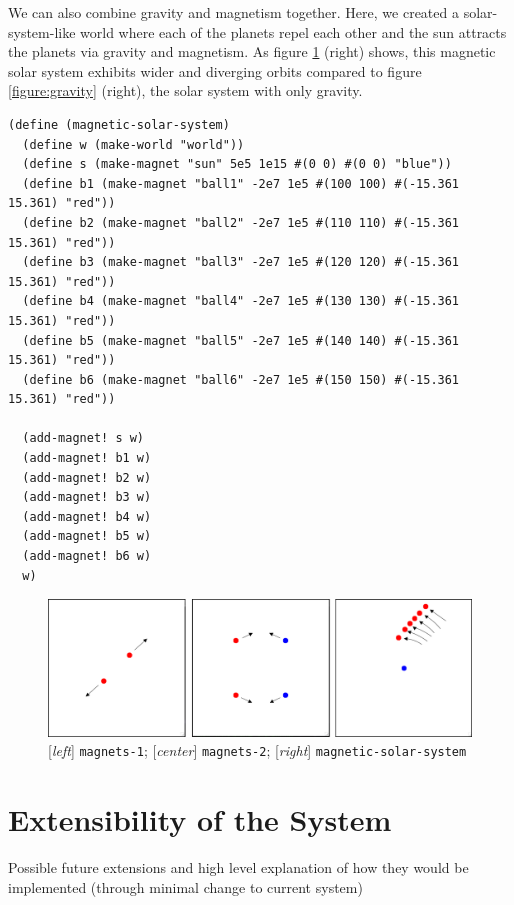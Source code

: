 \documentclass{article}
\begin{document}
We can also combine gravity and magnetism together. Here, we created a solar-system-like world where each of the planets repel each other and the sun attracts the planets via gravity and magnetism. As figure \ref{figure:magnetism} (right) shows, this magnetic solar system exhibits wider and diverging orbits compared to figure \ref{figure:gravity} (right), the solar system with only gravity. 
{\small\begin{verbatim}
(define (magnetic-solar-system)
  (define w (make-world "world"))
  (define s (make-magnet "sun" 5e5 1e15 #(0 0) #(0 0) "blue"))
  (define b1 (make-magnet "ball1" -2e7 1e5 #(100 100) #(-15.361 15.361) "red"))
  (define b2 (make-magnet "ball2" -2e7 1e5 #(110 110) #(-15.361 15.361) "red"))
  (define b3 (make-magnet "ball3" -2e7 1e5 #(120 120) #(-15.361 15.361) "red"))
  (define b4 (make-magnet "ball4" -2e7 1e5 #(130 130) #(-15.361 15.361) "red"))
  (define b5 (make-magnet "ball5" -2e7 1e5 #(140 140) #(-15.361 15.361) "red"))
  (define b6 (make-magnet "ball6" -2e7 1e5 #(150 150) #(-15.361 15.361) "red"))

  (add-magnet! s w)
  (add-magnet! b1 w)
  (add-magnet! b2 w)
  (add-magnet! b3 w)
  (add-magnet! b4 w)
  (add-magnet! b5 w)
  (add-magnet! b6 w)
  w)
\end{verbatim}}

\begin{figure}[h!]
  \centering
 \includegraphics[width=\textwidth,height=\textheight,keepaspectratio]{figs/magnetism.png}
  \caption{[\textit{left}] \texttt{magnets-1}; [\textit{center}] \texttt{magnets-2}; [\textit{right}] \texttt{magnetic-solar-system}}
  \label{figure:magnetism}
\end{figure}


\section{Extensibility of the System}
Possible future extensions and high level explanation of how they would be implemented (through minimal change to current system)
\end{document}
